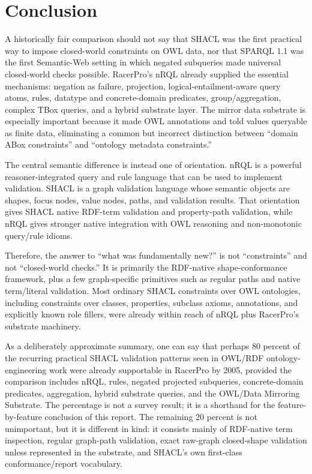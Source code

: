 \documentclass[11pt,letterpaper]{article}
\newcommand{\nrql}{nRQL}
\newcommand{\racer}{RacerPro}
\newcommand{\shacl}{SHACL}
\newcommand{\naf}{negation as failure}
\newcommand{\tbox}{TBox}
\newcommand{\rdf}{RDF}
\newcommand{\owl}{OWL}
\begin{document}
\section{Conclusion}

A historically fair comparison should not say that \shacl{} was the first practical way to impose closed-world constraints on \owl{} data, nor that SPARQL 1.1 was the first Semantic-Web setting in which negated subqueries made universal closed-world checks possible. RacerPro's \nrql{} already supplied the essential mechanisms: \naf{}, projection, logical-entailment-aware query atoms, rules, datatype and concrete-domain predicates, group/aggregation, complex \tbox{} queries, and a hybrid substrate layer. The mirror data substrate is especially important because it made \owl{} annotations and told values queryable as finite data, eliminating a common but incorrect distinction between ``domain ABox constraints'' and ``ontology metadata constraints.''

The central semantic difference is instead one of orientation. \nrql{} is a powerful reasoner-integrated query and rule language that can be used to implement validation. \shacl{} is a graph validation language whose semantic objects are shapes, focus nodes, value nodes, paths, and validation results. That orientation gives \shacl{} native \rdf{}-term validation and property-path validation, while \nrql{} gives stronger native integration with \owl{} reasoning and non-monotonic query/rule idioms.

Therefore, the answer to ``what was fundamentally new?'' is not ``constraints'' and not ``closed-world checks.'' It is primarily the \rdf{}-native shape-conformance framework, plus a few graph-specific primitives such as regular paths and native term/literal validation. Most ordinary \shacl{} constraints over \owl{} ontologies, including constraints over classes, properties, subclass axioms, annotations, and explicitly known role fillers, were already within reach of \nrql{} plus RacerPro's substrate machinery.

As a deliberately approximate summary, one can say that perhaps 80 percent of the recurring practical \shacl{} validation patterns seen in OWL/RDF ontology-engineering work were already supportable in \racer{} by 2005, provided the comparison includes \nrql{}, rules, negated projected subqueries, concrete-domain predicates, aggregation, hybrid substrate queries, and the OWL/Data Mirroring Substrate. The percentage is not a survey result; it is a shorthand for the feature-by-feature conclusion of this report. The remaining 20 percent is not unimportant, but it is different in kind: it consists mainly of \rdf{}-native term inspection, regular graph-path validation, exact raw-graph closed-shape validation unless represented in the substrate, and \shacl{}'s own first-class conformance/report vocabulary.
\end{document}

